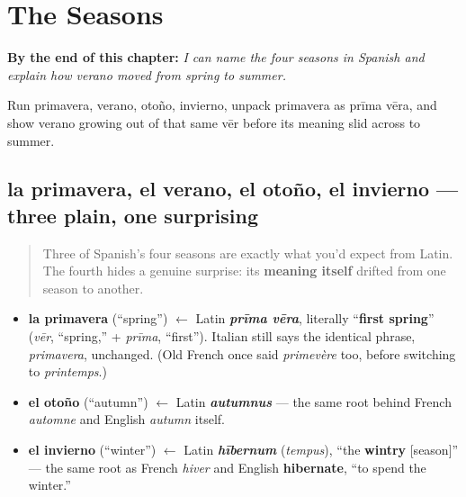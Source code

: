 
\chapter{The Seasons}
\label{ch:spanish-seasons}

\begin{chapteropening}
\textbf{By the end of this chapter:} \emph{I can name the four seasons in Spanish and explain how verano moved from spring to summer.}

Run primavera, verano, otoño, invierno, unpack primavera as prīma vēra, and show verano growing out of that same vēr before its meaning slid across to summer.
\end{chapteropening}

\section[la primavera, el verano, el otoño, el invierno]{la primavera, el verano, el otoño, el invierno — three plain, one surprising}

\label{lesson:ES-C25-las-estaciones}



\begin{quote}
Three of Spanish's four seasons are exactly what you'd expect from Latin. The fourth hides a genuine surprise: its \textbf{meaning itself} drifted from one season to another.
\end{quote}

\begin{cousinweb}
\begin{itemize}
\raggedright
  \item \textbf{la primavera} (\textquotedblleft{}spring\textquotedblright{}) $\leftarrow$ Latin \emph{\textbf{prīma vēra}}, literally \textquotedblleft{}\textbf{first spring}\textquotedblright{} (\emph{vēr}, \textquotedblleft{}spring,\textquotedblright{} + \emph{prīma}, \textquotedblleft{}first\textquotedblright{}). Italian still says the identical phrase, \emph{primavera}, unchanged. (Old French once said \emph{primevère} too, before switching to \emph{printemps}.)
  \item \textbf{el otoño} (\textquotedblleft{}autumn\textquotedblright{}) $\leftarrow$ Latin \emph{\textbf{autumnus}} — the same root behind French \emph{automne} and English \emph{autumn} itself.
  \item \textbf{el invierno} (\textquotedblleft{}winter\textquotedblright{}) $\leftarrow$ Latin \emph{\textbf{hībernum}} (\emph{tempus}), \textquotedblleft{}the \textbf{wintry} {[}season{]}\textquotedblright{} — the same root as French \emph{hiver} and English \textbf{hibernate}, \textquotedblleft{}to spend the winter.\textquotedblright{}
\end{itemize}
\end{cousinweb}


